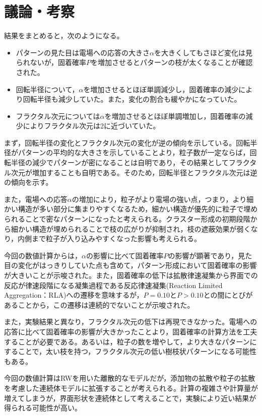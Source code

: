 \documentclass[autodetect-engine,dvi=dvipdfmx,a4paper,ja=standard,oneside,openany,11pt,draft]{bxjsbook}
\begin{document}
\section{議論・考察}
結果をまとめると，次のようになる。
\begin{itemize}
  \item パターンの見た目は電場への応答の大きさ$\alpha$を大きくしてもさほど変化は見られないが，固着確率$P$を増加させるとパターンの枝が太くなることが確認された。
  \item 回転半径について，$\alpha$を増加させるとほぼ単調減少し，固着確率の減少により回転半径も減少していた。また，変化の割合も緩やかになっていた。
  \item フラクタル次元については$\alpha$を増加させるとほぼ単調増加し，固着確率の減少によりフラクタル次元は2に近づいていた。
\end{itemize}

まず，回転半径の変化とフラクタル次元の変化が逆の傾向を示している。回転半径がパターンの平均的な大きさを示していることより，粒子数が一定ならば，回転半径の減少でパターンが密になることは自明であり，その結果としてフラクタル次元が増加することも自明である。そのため，回転半径とフラクタル次元は逆の傾向を示す。

また，電場への応答$\alpha$の増加により，粒子がより電場の強い点，つまり，より細かい構造が多い部分に集まりやすくなるため，細かい構造が優先的に粒子で埋められることで密なパターンになったと考えられる。クラスター形成の初期段階から細かい構造が埋められることで枝の広がりが抑制され，枝の遮蔽効果が弱くなり，内側まで粒子が入り込みやすくなった影響も考えられる。

今回の数値計算からは，$\alpha$の影響に比べて固着確率$P$の影響が顕著であり，見た目の変化がはっきりしていた点も含めて，パターン形成において固着確率の影響が大きいことが示唆された。また，固着確率の低下は拡散律速凝集から界面での反応が律速段階になる凝集過程である反応律速凝集(Reaction Limited Aggregation：RLA)への遷移を意味するが，$P=0.10$と$P>0.10$との間にとびがあることから，この遷移は連続的でないことが示唆された。

また，実験結果と異なり，フラクタル次元の低下は再現できなかった。電場への応答に比べて固着確率の影響が大きかったことより，固着確率の計算方法を工夫することが必要である。あるいは，粒子の数を増やして，より大きなパターンにすることで，太い枝を持つ，フラクタル次元の低い樹枝状パターンになる可能性もある。

今回の数値計算はRWを用いた離散的なモデルだが，添加物の拡散や粒子の拡散を考慮した連続体モデルに拡張することが考えられる。計算の複雑さや計算量が増えてしまうが，界面形状を連続体として考えることで，実験により近い結果が得られる可能性が高い。

\ifdraft{
  
  
}{}
\end{document}
